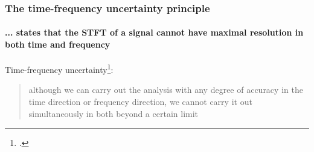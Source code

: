 \documentclass[usenames,dvipsnames]{beamer}
\begin{document}
\begin{frame}
	\frametitle{The time-frequency uncertainty principle}
	\framesubtitle{... states that the STFT of a signal cannot have maximal resolution in both time and frequency}
	    Time-frequency uncertainty\footcite{gabor1946}:
	    \begin{quote}
		    although we can carry out the analysis with any degree of accuracy in the time direction or frequency direction, we cannot carry it out simultaneously in both beyond a certain limit
	    \end{quote}
	\begin{figure}[ht]
		\centering
		\vspace{-1.5em}
	\end{figure}
\end{frame}
\end{document}
